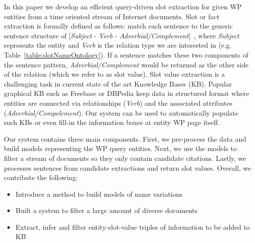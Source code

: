 In this paper we develop an efficient query-driven slot extraction for given WP entities from a time oriented stream of Internet documents.
Slot or fact extraction is formally defined as follows: match each sentence to the generic sentence structure of [\textit{Subject} - \textit{Verb} - \textit{Adverbial/Complement}]~\cite{sentencePatterns08}, where  \textit{Subject} represents the entity and \textit{Verb} is the relation type we are interested in (e.g. Table~\ref{table:slotNameOntology}).
If a sentence matches these two components of the sentence pattern, \textit{Adverbial/Complement} would be returned as the other side of the relation (which we refer to as slot value). Slot value extraction is a challenging task in current state of the art Knowledge Bases (KB). Popular graphical KB such as Freebase or DBPedia keep data in structured format where entities are connected via relationships (\textit{Verb}) and the associated attributes (\textit{Adverbial/Compelement}). Our system can be used to automatically populate such KBs or even fill-in the information boxes at entity WP page itself.


Our system contains three main components. First, we pre-process the data and build models representing the WP query entities. Next, we use the models to filter a stream of documents so they only contain candidate citations. Lastly, we processes sentences from candidate extractions and return slot values. 
Overall, we contribute the following:
\begin{itemize}[noitemsep,nolistsep]
\item Introduce a method to build models of name variations
\item Built a system to filter a large amount of diverse documents
\item Extract, infer and filter entity-slot-value triples of information to be added to KB 
\end{itemize}

